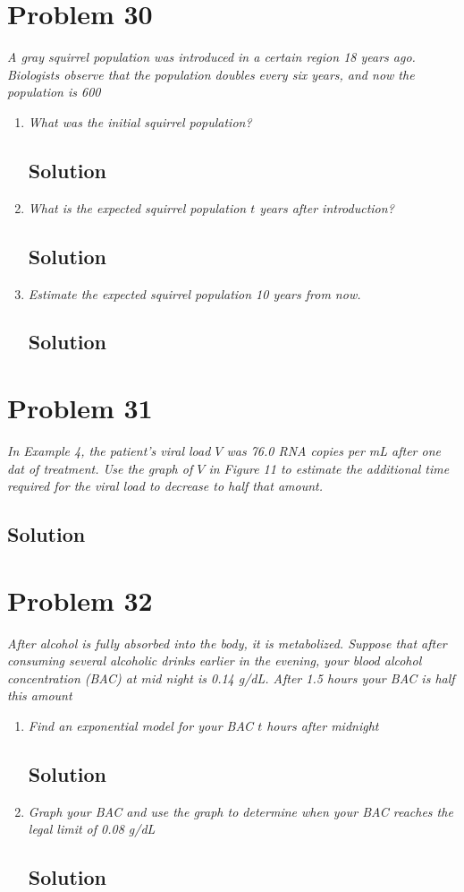 \documentclass[11pt]{article}
\newcommand{\soln}{\subsection*}
\newcommand{\qn}{\textit}
\begin{document}
\section*{Problem 30}

\qn{A gray squirrel population was introduced in a certain region 18 years ago. Biologists observe that the population doubles every six years, and now the population is 600}

\begin{enumerate}
	\item \qn{What was the initial squirrel population?}
	\soln{Solution}
	
	\item \qn{What is the expected squirrel population $t$ years after introduction?}
	\soln{Solution}
	
	\item \qn{Estimate the expected squirrel population 10 years from now.}
	\soln{Solution}
\end{enumerate}

\section*{Problem 31}

\qn{In Example 4, the patient's viral load $V$ was 76.0 RNA copies per mL after one dat of treatment. Use the graph of $V$ in Figure 11 to estimate the additional time required for the viral load to decrease to half that amount.}

\soln{Solution}

\section*{Problem 32}

\qn{After alcohol is fully absorbed into the body, it is metabolized. Suppose that after consuming several alcoholic drinks earlier in the evening, your blood alcohol concentration (BAC) at mid night is 0.14 g/dL. After 1.5 hours your BAC is half this amount}

\begin{enumerate}
	\item \qn{Find an exponential model for your BAC $t$ hours after midnight}
	\soln{Solution}
	
	\item \qn{Graph your BAC and use the graph to determine when your BAC reaches the legal limit of 0.08 g/dL}
	\soln{Solution}
\end{enumerate}
\end{document}
